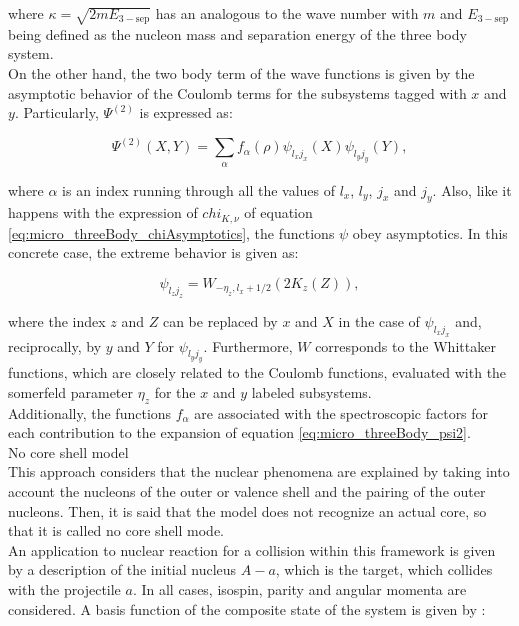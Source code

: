 \documentclass[openany]{book}
\begin{document}
where $\kappa = \sqrt{2mE_{\mathrm{3-sep}}}$ has an analogous to the wave number with $m$ and $E_{\mathrm{3-sep}}$ being defined as the nucleon mass and separation energy of the three body system. \\
	
On the other hand, the two body term of the wave functions is given by the asymptotic behavior of the Coulomb terms for the subsystems tagged with $x$ and $y$. Particularly, $\Psi^{(2)}$ is expressed as: 

\begin{equation}\label{eq:micro_threeBody_psi2}
	\Psi^{(2)}(X, Y) =  \sum_{\alpha} {f_\alpha (\rho) \psi_{l_xj_x}(X) \psi_{l_yj_y}(Y) }, 
\end{equation}

where $\alpha$ is an index running through all the values of $l_x$, $l_y$, $j_x$ and $j_y$. Also, like it happens with the expression of $chi_{K, \nu}$ of equation  \ref{eq:micro_threeBody_chiAsymptotics}, the functions $\psi$ obey asymptotics. In this concrete case, the extreme behavior is given as: 

\begin{equation}\label{eq:micro_threeBody_psi2_asymptotic}
	\psi_{l_{z}j_{z}} = W_{-\eta_{z}, l_x + 1/2}(2K_{z}(Z)),
\end{equation}

where the index $z$ and $Z$ can be replaced by $x$ and $X$ in the case of $\psi_{l_{x}j_{x}}$ and, reciprocally, by $y$ and $Y$ for $\psi_{l_{y}j_{y}}$. Furthermore, $W$ corresponds to the Whittaker functions, which are closely related to the Coulomb functions, evaluated with the somerfeld parameter $\eta_{z}$ for the $x$ and $y$ labeled subsystems.\\

Additionally, the functions $f_\alpha$ are associated with the spectroscopic factors for each contribution to the expansion of equation \ref{eq:micro_threeBody_psi2}. \\

No core shell model 
\cite{barrett_navratil_vary_2013} \\

This approach considers that the nuclear phenomena are explained by taking into account the nucleons of the outer or valence shell and the pairing of the outer nucleons. Then, it is said that the model does not recognize an actual core, so that it is called no core shell mode. \\

An application to nuclear reaction for a collision within this framework is given by a description of the initial nucleus $A - a$, which is the target, which collides with the projectile $a$. In all cases, isospin, parity and angular momenta are considered. A basis function of the composite state of the system is given by \cite{barrett_navratil_vary_2013}:
\end{document}
